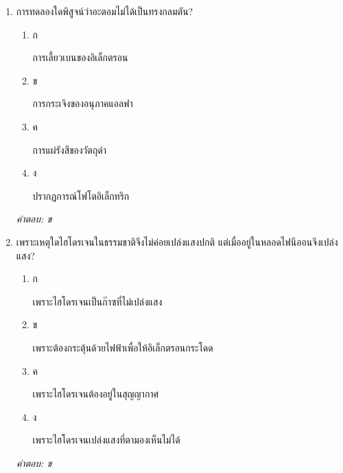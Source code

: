 \documentclass[12pt]{article}
\begin{document}
\begin{enumerate}[label=\arabic*., itemsep=0.5\baselineskip, topsep=0.5\baselineskip, leftmargin=*]
\item การทดลองใดพิสูจน์ว่าอะตอมไม่ได้เป็นทรงกลมตัน?
\begin{enumerate}[label=\alph*)., itemsep=0.3\baselineskip, topsep=0.3\baselineskip]
\item ก\ 
\begin{minipage}[t]{0.9\linewidth}
\raggedright การเลี้ยวเบนของอิเล็กตรอน
\end{minipage}
\item ข\ 
\begin{minipage}[t]{0.9\linewidth}
\raggedright การกระเจิงของอนุภาคแอลฟา
\end{minipage}
\item ค\ 
\begin{minipage}[t]{0.9\linewidth}
\raggedright การแผ่รังสีของวัตถุดำ
\end{minipage}
\item ง\ 
\begin{minipage}[t]{0.9\linewidth}
\raggedright ปรากฏการณ์โฟโตอิเล็กทริก
\end{minipage}
\end{enumerate}
\vspace{-0.3\baselineskip}
\begin{small}
\textit{คำตอบ: ข}
\end{small}

\item เพราะเหตุใดไฮโดรเจนในธรรมชาติจึงไม่ค่อยเปล่งแสงปกติ แต่เมื่ออยู่ในหลอดไฟนีออนจึงเปล่งแสง?
\begin{enumerate}[label=\alph*)., itemsep=0.3\baselineskip, topsep=0.3\baselineskip]
\item ก\ 
\begin{minipage}[t]{0.9\linewidth}
\raggedright เพราะไฮโดรเจนเป็นก๊าซที่ไม่เปล่งแสง
\end{minipage}
\item ข\ 
\begin{minipage}[t]{0.9\linewidth}
\raggedright เพราะต้องกระตุ้นด้วยไฟฟ้าเพื่อให้อิเล็กตรอนกระโดด
\end{minipage}
\item ค\ 
\begin{minipage}[t]{0.9\linewidth}
\raggedright เพราะไฮโดรเจนต้องอยู่ในสุญญากาศ
\end{minipage}
\item ง\ 
\begin{minipage}[t]{0.9\linewidth}
\raggedright เพราะไฮโดรเจนเปล่งแสงที่ตามองเห็นไม่ได้
\end{minipage}
\end{enumerate}
\vspace{-0.3\baselineskip}
\begin{small}
\textit{คำตอบ: ข}
\end{small}


\end{enumerate}
\end{document}
